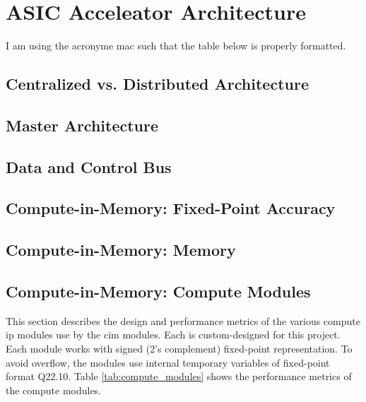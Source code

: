\documentclass[12pt, hidelinks]{article}
\begin{document}
\section{ASIC Acceleator Architecture}
I am using the acronyme \ac{mac} such that the table below is properly formatted.
\lipsum[1]
\subsection{Centralized vs. Distributed Architecture}
\subsection{Master Architecture}
\subsection{Data and Control Bus}
\subsection{Compute-in-Memory: Fixed-Point Accuracy}
\subsection{Compute-in-Memory: Memory}
\subsection{Compute-in-Memory: Compute Modules}
This section describes the design and performance metrics of the various compute \ac{ip} modules use by the \ac{cim} modules. Each is custom-designed for this project.
Each module works with signed (2's complement) fixed-point representation. To avoid overflow, the modules use internal temporary variables of fixed-point format Q22.10.
Table \ref{tab:compute_modules} shows the performance metrics of the compute modules.
\end{document}
